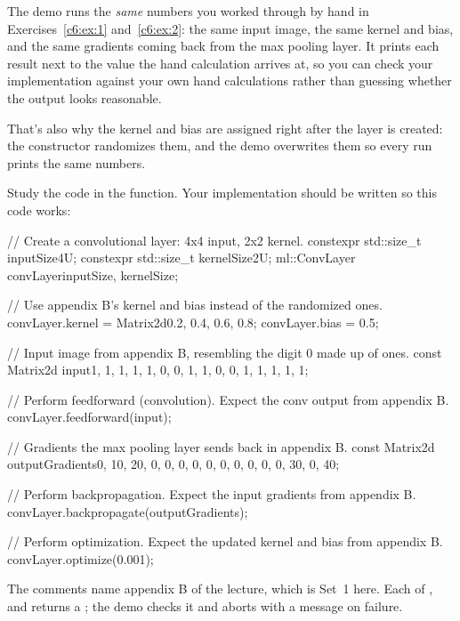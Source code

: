 The demo runs the \emph{same} numbers you worked through by hand in Exercises~\ref{c6:ex:1}
and~\ref{c6:ex:2}: the same input image, the same kernel and bias, and the same gradients coming
back from the max pooling layer. It prints each result next to the value the hand calculation
arrives at, so you can check your implementation against your own hand calculations rather than
guessing whether the output looks reasonable.

That's also why the kernel and bias are assigned right after the layer is created: the constructor
randomizes them, and the demo overwrites them so every run prints the same numbers.

Study the code in the  function. Your implementation should be written so this code
works:

\begin{cppcode}
// Create a convolutional layer: 4x4 input, 2x2 kernel.
constexpr std::size_t inputSize{4U};
constexpr std::size_t kernelSize{2U};
ml::ConvLayer convLayer{inputSize, kernelSize};

// Use appendix B's kernel and bias instead of the randomized ones.
convLayer.kernel = Matrix2d{{0.2, 0.4}, {0.6, 0.8}};
convLayer.bias   = 0.5;

// Input image from appendix B, resembling the digit 0 made up of ones.
const Matrix2d input{{1, 1, 1, 1},
                     {1, 0, 0, 1},
                     {1, 0, 0, 1},
                     {1, 1, 1, 1}};

// Perform feedforward (convolution). Expect the conv output from appendix B.
convLayer.feedforward(input);

// Gradients the max pooling layer sends back in appendix B.
const Matrix2d outputGradients{{0, 10, 20, 0},
                               {0,  0,  0, 0},
                               {0,  0,  0, 0},
                               {0, 30,  0, 40}};

// Perform backpropagation. Expect the input gradients from appendix B.
convLayer.backpropagate(outputGradients);

// Perform optimization. Expect the updated kernel and bias from appendix B.
convLayer.optimize(0.001);
\end{cppcode}

\noindent The comments name appendix B of the lecture, which is Set~1 here. Each of
,  and  returns a ; the demo
checks it and aborts with a message on failure.
